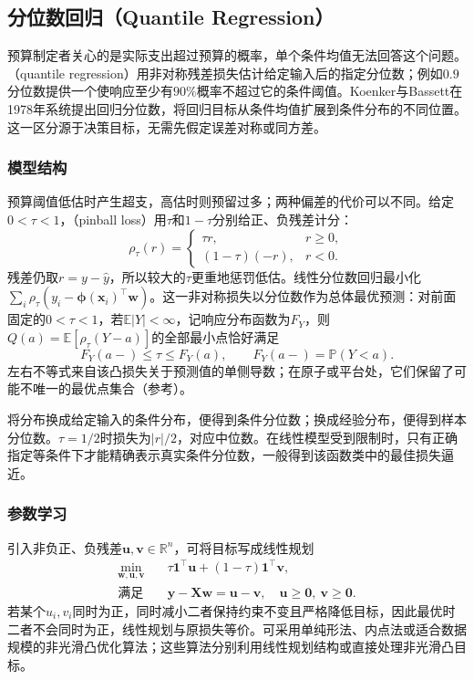 \subsection{分位数回归（Quantile Regression）}
\label{sec:regression-quantiles}

预算制定者关心的是实际支出超过预算的概率，单个条件均值无法回答这个问题。（quantile regression）用非对称残差损失估计给定输入后的指定分位数；例如$0.9$分位数提供一个使响应至少有$90\%$概率不超过它的条件阈值。Koenker与Bassett在1978年系统提出回归分位数，将回归目标从条件均值扩展到条件分布的不同位置。这一区分源于决策目标，无需先假定误差对称或同方差。

\subsubsection{模型结构}

预算阈值低估时产生超支，高估时则预留过多；两种偏差的代价可以不同。给定$0<\tau<1$，（pinball loss）用$\tau$和$1-\tau$分别给正、负残差计分：
\begin{equation}
  \rho_\tau(r)=
  \begin{cases}
    \tau r,&r\geq0,\\
    (1-\tau)(-r),&r<0.
  \end{cases}
  \label{eq:regression-pinball}
\end{equation}
残差仍取$r=y-\widehat y$，所以较大的$\tau$更重地惩罚低估。线性分位数回归最小化$\sum_i\rho_\tau(y_i-\bm\phi(\bm x_i)^\top\bm w)$。这一非对称损失以分位数作为总体最优预测：对前面固定的$0<\tau<1$，若$\mathbb E|Y|<\infty$，记响应分布函数为$F_Y$，则$Q(a)=\mathbb E[\rho_\tau(Y-a)]$的全部最小点恰好满足
\[
 F_Y(a-)\leq\tau\leq F_Y(a),
 \qquad F_Y(a-)=\mathbb P(Y<a).
\]
左右不等式来自该凸损失关于预测值的单侧导数；在原子或平台处，它们保留了可能不唯一的最优点集合（参考）。

将分布换成给定输入的条件分布，便得到条件分位数；换成经验分布，便得到样本分位数。$\tau=1/2$时损失为$|r|/2$，对应中位数。在线性模型受到限制时，只有正确指定等条件下才能精确表示真实条件分位数，一般得到该函数类中的最佳损失逼近。

\subsubsection{参数学习}

引入非负正、负残差$\bm{u},\bm{v}\in\mathbb{R}^{n}$，可将目标写成线性规划
\begin{equation}
  \begin{aligned}
    \min_{\bm{w},\bm{u},\bm{v}}\quad&
      \tau\bm{1}^{\top}\bm{u}+(1-\tau)\bm{1}^{\top}\bm{v},\\
    \text{满足}\quad&
      \bm{y}-\bm{X}\bm{w}=\bm{u}-\bm{v},
      \quad\bm{u}\geq\bm{0},\ \bm{v}\geq\bm{0}.
  \end{aligned}
  \label{eq:regression-quantile-lp}
\end{equation}
若某个$u_i,v_i$同时为正，同时减小二者保持约束不变且严格降低目标，因此最优时二者不会同时为正，线性规划与原损失等价。可采用单纯形法、内点法或适合数据规模的非光滑凸优化算法；这些算法分别利用线性规划结构或直接处理非光滑凸目标。

